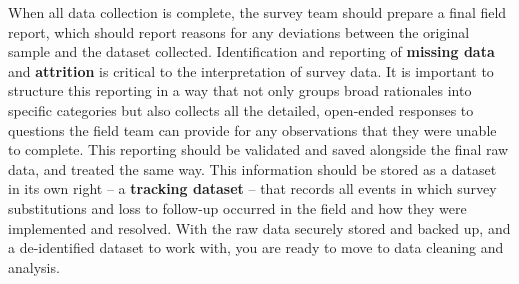 When all data collection is complete, the survey team should prepare a final field report,
which should report reasons for any deviations between the original sample and the dataset collected.
Identification and reporting of \textbf{missing data} and \textbf{attrition}
is critical to the interpretation of survey data.
It is important to structure this reporting in a way that not only
groups broad rationales into specific categories
but also collects all the detailed, open-ended responses
to questions the field team can provide for any observations that they were unable to complete.
This reporting should be validated and saved alongside the final raw data, and treated the same way.
This information should be stored as a dataset in its own right
-- a \textbf{tracking dataset} -- that records all events in which survey substitutions
and loss to follow-up occurred in the field and how they were implemented and resolved.
With the raw data securely stored and backed up,
and a de-identified dataset to work with, you are ready to move to data cleaning and analysis.

